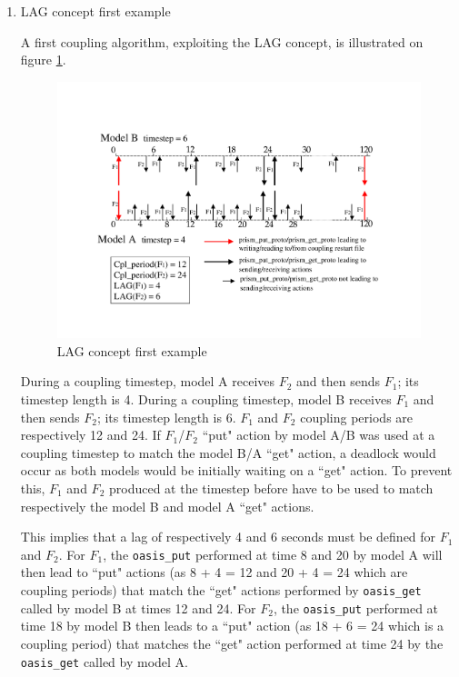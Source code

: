 \begin{enumerate}

\item LAG concept first example
 
  A first coupling algorithm, exploiting the LAG concept, is
  illustrated on figure \ref{fig:lag_concept_1}.

  

  \begin{figure}
    \includegraphics[scale=.6]{figures/fig_lag_concept_1}
    \caption{LAG concept first example}
    \label{fig:lag_concept_1}
  \end{figure}

  During a coupling timestep, model A receives $F_2$ and then sends
  $F_1$; its timestep length is 4. During a coupling timestep, model B
  receives $F_1$ and then sends $F_2$; its timestep length is 6.
  $F_1$ and $F_2$ coupling periods are respectively 12 and 24. If
  $F_1$/$F_2$ ``put" action by model A/B was used at a coupling
  timestep to match the model B/A ``get" action, a deadlock would
  occur as both models would be initially waiting on a ``get"
  action. To prevent this, $F_1$ and $F_2$ produced at the timestep
  before have to be used to match respectively the model B and model A
  ``get" actions.

  This implies that a lag of respectively 4 and 6 seconds must be
  defined for $F_1$ and $F_2$. For $F_1$, the {\tt oasis\_put}
  performed at time 8 and 20 by model A will then lead to ``put"
  actions (as 8 + 4 = 12 and 20 + 4 = 24 which are coupling periods)
  that match the ``get" actions performed by {\tt oasis\_get} called by model B
  at times 12 and 24.  For $F_2$, the {\tt oasis\_put}
  performed at time 18 by model B then leads to a ``put" action (as 18
  + 6 = 24 which is a coupling period) that matches the ``get" action
  performed at time 24 by the {\tt oasis\_get} called by model A.


\end{enumerate}
